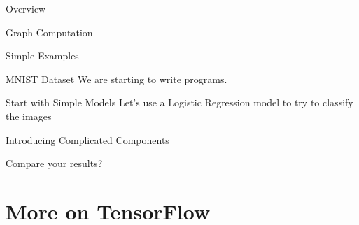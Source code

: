 \documentclass{beamer}
\begin{document}
\begin{frame}{Overview}
\end{frame}

\begin{frame}{Graph Computation}
\end{frame}

\begin{frame}{Simple Examples}
\end{frame}

\begin{frame}{MNIST Dataset}
We are starting to write programs.    
\end{frame}

\begin{frame}{Start with Simple Models}
    Let's use a Logistic Regression model to try to classify the images
\end{frame}

\begin{frame}{Introducing Complicated Components}
    
\end{frame}

\begin{frame}{Compare your results?}
    
\end{frame}

\section{More on TensorFlow}
\end{document}
